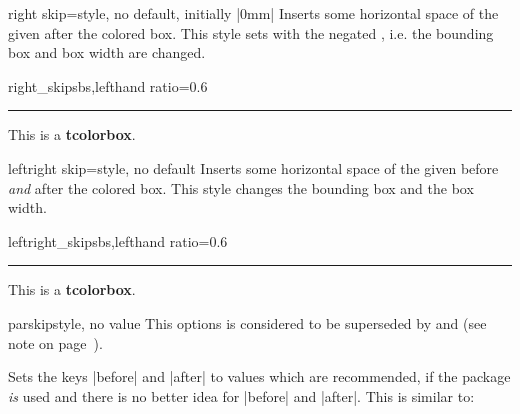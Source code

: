 \begin{docTcbKey}[][doc new=2014-11-07]{right skip}{=}{style, no default, initially |0mm|}
  Inserts some horizontal space of the given  after the colored box.
  This style sets  with the negated ,
  i.e. the bounding box and box width are changed.
\begin{exdispExample*}{right_skip}{sbs,lefthand ratio=0.6}
\noindent\rule{\linewidth}{2pt}

\begin{tcolorbox}[right skip=1cm,
    colframe=red!50!white]
  This is a \textbf{tcolorbox}.
\end{tcolorbox}
\end{exdispExample*}
\end{docTcbKey}

\begin{docTcbKey}[][doc new=2014-10-10]{leftright skip}{=}{style, no default}
  Inserts some horizontal space of the given  before \emph{and} after the colored box.
  This style changes the bounding box and the box width.
\begin{exdispExample*}{leftright_skip}{sbs,lefthand ratio=0.6}
\noindent\rule{\linewidth}{2pt}

\begin{tcolorbox}[leftright skip=1cm,
    colframe=red!50!white]
  This is a \textbf{tcolorbox}.
\end{tcolorbox}
\end{exdispExample*}
\end{docTcbKey}


\clearpage

\begin{docTcbKey}[][doc updated=2017-02-01]{parskip}{}{style, no value}
  This options is considered to be superseded by
   and 
  (see note on page~\pageref{subsec:surroundings}).\par
  Sets the keys |before| and |after| to values which are
  recommended, if the package  \emph{is} used and there is no better
  idea for |before| and |after|. This is similar to:
\begin{dispListing}
\end{dispListing}
\end{docTcbKey}


